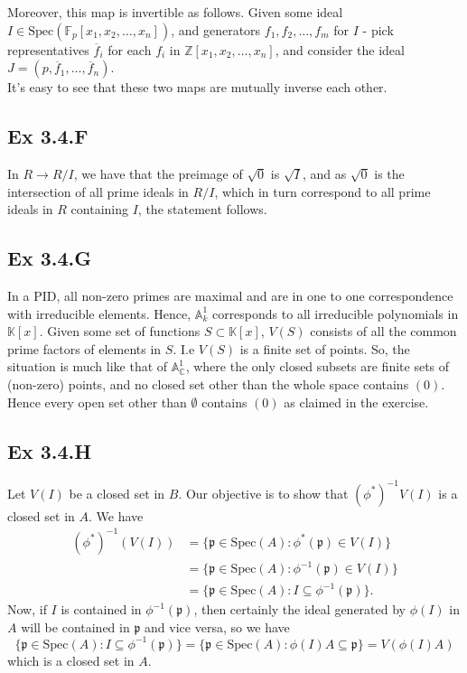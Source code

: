 \documentclass{article}
\theoremstyle{definition}
\newcommand{\Z}{\mathbb{Z}}
\newcommand{\C}{\mathbb{C}}
\newcommand{\K}{\mathbb{K}}
\newcommand{\F}{\mathbb{F}}
\newcommand{\A}{\mathbb{A}}
\newcommand{\Spec}{\text{Spec}}
\newcommand{\spec}{\Spec}
\begin{document}
Moreover, this map is invertible as follows. Given some ideal $I \in
\spec(\F_p[x_1, x_2, \ldots, x_n])$, and generators $f_1, f_2, \ldots, f_m$ for
$I$ - pick representatives $\overline{f}_i$ for each $f_i$ in $\Z[x_1, x_2,
\ldots, x_n]$, and consider the ideal $J = (p, \overline{f}_1, \ldots,
\overline{f}_n)$. \\

It's easy to see that these two maps are mutually inverse each other.

\subsection*{Ex 3.4.F}

In $R \to R/I$, we have that the preimage of $\sqrt{0}$ is $\sqrt{I}$, and as
$\sqrt{0}$ is the intersection of all prime ideals in $R/I$, which in turn
correspond to all prime ideals in $R$ containing $I$, the statement follows.

\subsection*{Ex 3.4.G}

In a PID, all non-zero primes are maximal and are in one to one correspondence
with irreducible elements. Hence, $\A^1_k$ corresponds to all irreducible
polynomials in $\K[x]$. Given some set of functions $S \subset \K[x]$, $V(S)$
consists of all the common prime factors of elements in $S$. I.e $V(S)$ is a
finite set of points. So, the situation is much like that of $\A^1_{\C}$, where
the only closed subsets are finite sets of (non-zero) points, and no closed set
other than the whole space contains $(0)$. Hence every open set other than
$\emptyset$ contains $(0)$ as claimed in the exercise.

\subsection*{Ex 3.4.H}

Let $V(I)$ be a closed set in $B$. Our objective is to show that
$(\phi^*)^{-1}V(I)$ is a closed set in $A$. We have
\begin{align*}
	(\phi^*)^{-1}(V(I))
	&=
	\{
		\mathfrak{p} \in \spec(A) : \phi^*(\mathfrak{p}) \in V(I)
	\} \\
	&=
	\{
		\mathfrak{p} \in \spec(A) : \phi^{-1}(\mathfrak{p}) \in V(I)
	\} \\
	&=
	\{
		\mathfrak{p} \in \spec(A) : I \subseteq \phi^{-1}(\mathfrak{p})
	\}.
\end{align*}
Now, if $I$ is contained in $\phi^{-1}(\mathfrak{p})$, then certainly the ideal 
generated by $\phi(I)$ in $A$ will be contained in $\mathfrak{p}$ and vice versa, 
so we have
\[
	\{
		\mathfrak{p} \in \spec(A) : I \subseteq \phi^{-1}(\mathfrak{p})
	\} 
	=
	\{
		\mathfrak{p} \in \spec(A) : \phi(I)A \subseteq \mathfrak{p}
	\} 
	=
	V(\phi(I)A)
\] 
which is a closed set in $A$.
\end{document}
